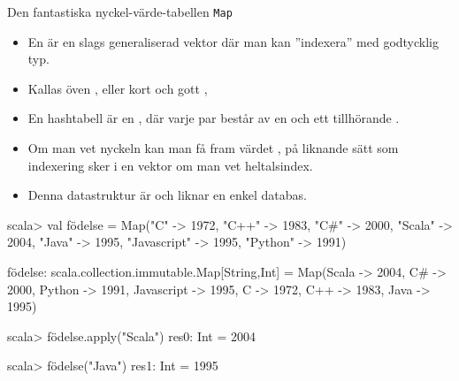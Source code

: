 \begin{Slide}{Den fantastiska nyckel-värde-tabellen \texttt{Map}}\SlideFontSmall
\begin{itemize}
\item En   är en slags generaliserad vektor där man kan ''indexera'' med godtycklig typ.

\item Kallas öven \href{https://sv.wikipedia.org/wiki/Hashtabell}{} ,   eller kort och gott  ,

\item En hashtabell är en , där varje par består av en   och ett tillhörande .

\item Om man vet nyckeln kan man få fram värdet , på liknande sätt som indexering sker i en vektor om man vet heltalsindex.

\item Denna datastruktur är  och liknar en enkel databas.
\end{itemize}
\begin{REPL}
scala> val födelse = Map("C" -> 1972,  "C++" -> 1983, "C#" -> 2000,
  "Scala" -> 2004, "Java" -> 1995, "Javascript" -> 1995, "Python" -> 1991)

födelse: scala.collection.immutable.Map[String,Int] = Map(Scala -> 2004, C# -> 2000, Python -> 1991, Javascript -> 1995, C -> 1972, C++ -> 1983, Java -> 1995)

scala> födelse.apply("Scala")
res0: Int = 2004

scala> födelse("Java")
res1: Int = 1995

\end{REPL}
\end{Slide}

